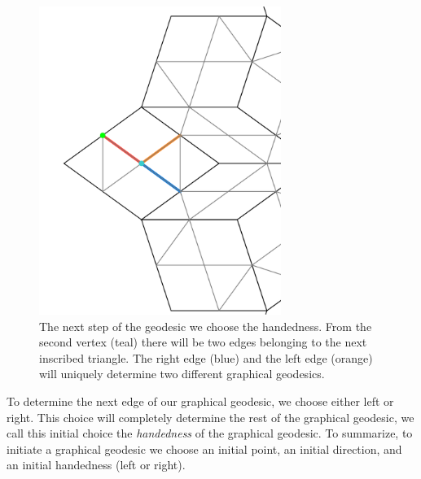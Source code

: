 \documentclass[
  oneside,
  11pt, a4paper,
  footinclude=true,
  headinclude=true,
  cleardoublepage=empty
]{scrbook}
\begin{document}
\begin{figure}[H]
\centering
\includegraphics[width=0.7\textwidth]{NextStep}
\caption[Next Step of Geodesic]{The next step of the geodesic we choose the handedness. From the second vertex (teal) there will be two edges belonging to the next inscribed triangle. The right edge (blue) and the left edge (orange) will uniquely determine two different graphical geodesics.}
\label{fig:nextstep}
\end{figure}
To determine the next edge of our graphical geodesic, we choose either left or right. This choice will completely determine the rest of the graphical geodesic, we call this initial choice the \textit{handedness} of the graphical geodesic. To summarize, to initiate a graphical geodesic we choose an initial point, an initial direction, and an initial handedness (left or right).
\end{document}
